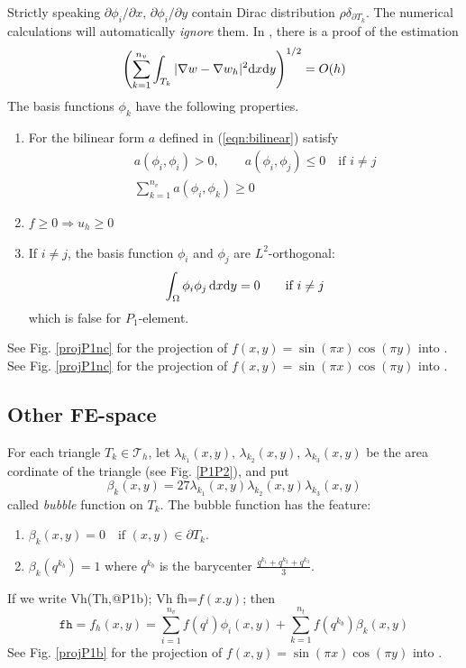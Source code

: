 \documentclass[a4paper,twoside,12pt]{book}
\def\d{\hbox{d}}
\def\p{\partial}
\begin{document}
Strictly speaking $\p \phi_i/\p x,\, \p \phi_i/\p y$
contain Dirac distribution $\rho \delta_{\p T_k}$.
The numerical calculations will automatically \emph{ignore} them.
In \cite{Thomasset}, there is a proof of the estimation
\[
\left(\sum_{k=1}^{n_v}\int_{T_k}|\nabla w-\nabla w_h|^2\d x\d y\right)^{1/2}
=O(h)
\]
The basis functions $\phi_k$ have the following properties.
\begin{enumerate}
  \item
  For the bilinear form $a$ defined in (\ref{eqn:bilinear}) satisfy
  \begin{eqnarray*}
  &&a(\phi_i,\phi_i)>0,\qquad a(\phi_i,\phi_j)\le 0\quad\textrm{if }i\neq j\\
  &&\sum_{k=1}^{n_v}a(\phi_i,\phi_k)\ge 0
  \end{eqnarray*}
  \item
  $f\ge 0 \Rightarrow u_h\ge 0$
  \item If $i\neq j$, the basis function $\phi_i$ and $\phi_j$ are $L^2$-orthogonal:
  $$
  \int_{\Omega}\phi_i\phi_j\, \d x\d y=0\qquad \textrm{if }i\neq j
  $$
  which is false for $P_1$-element.
\end{enumerate}
See Fig. \ref{projP1nc} for the projection of $f(x,y)=\sin(\pi x)\cos(\pi y)$
into .
See Fig. \ref{projP1nc} for the projection of $f(x,y)=\sin(\pi x)\cos(\pi y)$
into .


\subsection{Other FE-space}
For each triangle $T_k\in \mathcal{T}_h$,
let $\lambda_{k_1}(x,y),\, \lambda_{k_2}(x,y),\, \lambda_{k_3}(x,y)$ be
the area cordinate
of the triangle (see Fig. \ref{P1P2}), and put
\begin{equation}
\beta_k(x,y)=27\lambda_{k_1}(x,y)\lambda_{k_2}(x,y)\lambda_{k_3}(x,y)
\end{equation}
called \emph{bubble} function on $T_k$.
The bubble function has the feature:
\begin{enumerate}
  \item
  $\beta_k(x,y)=0\quad \textrm{if }(x,y)\in \p T_k$.
  \item
  $\beta_k(q^{k_b})=1$ where $q^{k_b}$ is the barycenter
  $\frac{q^{k_1}+q^{k_2}+q^{k_3}}{3}$.
\end{enumerate}
If we write
\bFF
Vh(Th,@P1b); Vh fh=$f(x.y)$;
\eFF
then
$$
\texttt{fh}=f_h(x,y)=\sum_{i=1}^{n_v}f(q^i)\phi_i(x,y)+\sum_{k=1}^{n_t}f(q^{k_b})\beta_k(x,y)
$$
See Fig. \ref{projP1b} for the projection of $f(x,y)=\sin(\pi x)\cos(\pi y)$
into .
\end{document}
